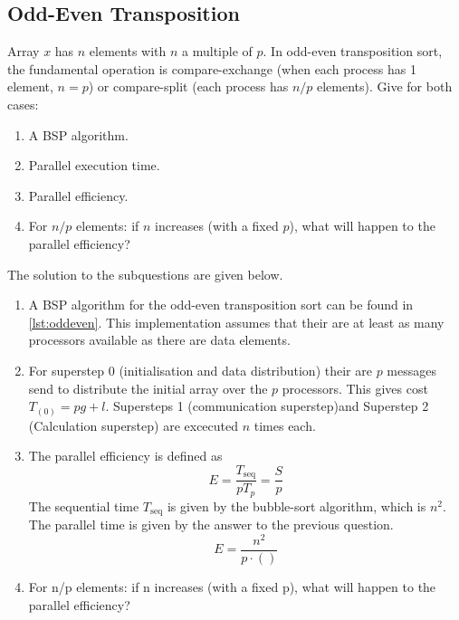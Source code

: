 \documentclass[../main.tex]{subfiles}
\begin{document}
\subsection{Odd-Even Transposition}
\begin{question}
Array $x$ has $n$ elements with $n$ a multiple of $p$. In odd-even transposition sort, the fundamental operation is compare-exchange (when each process has 1 element, $n = p$) or compare-split (each process has $n/p$ elements). Give for both cases:
\begin{enumerate}
	\item A BSP algorithm.
	\item Parallel execution time.
	\item Parallel efficiency.
	\item For $n/p$ elements: if $n$ increases (with a fixed $p$), what will happen to the parallel efficiency?
\end{enumerate}

\end{question}
\begin{solution} The solution to the subquestions are given below.
\begin{enumerate}
	\item A BSP algorithm for the odd-even transposition sort can be found in \autoref{lst:oddeven}. This implementation assumes that their are at least as many processors available as there are data elements.
		
	\item For superstep 0 (initialisation and data distribution) their are $p$ messages send to distribute the initial array over the $p$ processors. This gives cost $T_{(0)} = pg + l$. Supersteps 1 (communication superstep)and Superstep 2 (Calculation superstep) are excecuted $n$ times each.
	\item The parallel efficiency is defined as
	\begin{equation}
		E = \frac{T_\text{seq}}{p T_p} = \frac{S}{p}
	\end{equation}
	The sequential time $T_\text{seq}$ is given by the bubble-sort algorithm, which is $n^2$. The parallel time is given by the answer to the previous question.
	\begin{equation}
		E = \frac{n^2}{p \cdot ()}
	\end{equation}
	\item For n/p elements: if n increases (with a fixed p), what will happen to the parallel efficiency?
\end{enumerate}
\end{solution}
\end{document}
